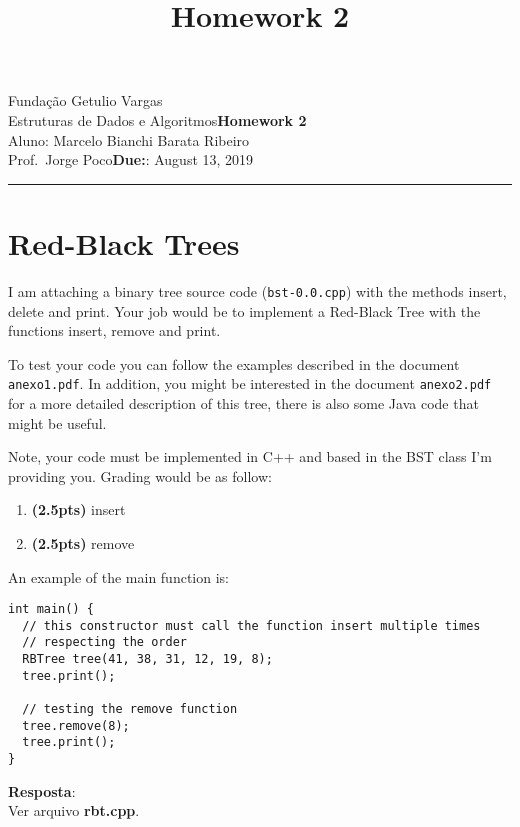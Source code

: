\documentclass{article}
\title{Homework 2}
\date{}
\newcommand{\assignment}{Homework 2}
\newcommand{\duedate}{August 13, 2019}
\begin{document}
Fundação Getulio Vargas\hfill\\
Estruturas de Dados e Algoritmos\hfill\textbf{\assignment}\\
Aluno: Marcelo Bianchi Barata Ribeiro\\
Prof.\ Jorge Poco\hfill\textbf{Due:}: \duedate\\
\smallskip\hrule\bigskip

{\let\newpage\relax\maketitle}
\maketitle


\section{Red-Black Trees}

I am attaching a binary tree source code (\texttt{bst-0.0.cpp}) with the methods insert, delete and print. Your job would be to implement a Red-Black Tree with the functions insert, remove and print. 

To test your code you can follow the examples described in the document \texttt{anexo1.pdf}. In addition, you might be interested in the document \texttt{anexo2.pdf} for a more detailed description of this tree, there is also some Java code that might be useful. 

Note, your code must be implemented in C++ and based in the BST class I'm providing you. Grading would be as follow:

\begin{enumerate}[label=(\alph*)]
  \item \textbf{(2.5pts)} insert 
  \item \textbf{(2.5pts)} remove 
\end{enumerate}

An example of the main function is: 

\begin{lstlisting}
int main() {
  // this constructor must call the function insert multiple times 
  // respecting the order
  RBTree tree(41, 38, 31, 12, 19, 8);
  tree.print();

  // testing the remove function
  tree.remove(8);
  tree.print();
}
\end{lstlisting}

\textbf{Resposta}:\\
Ver arquivo \textbf{rbt.cpp}.\\
\end{document}
